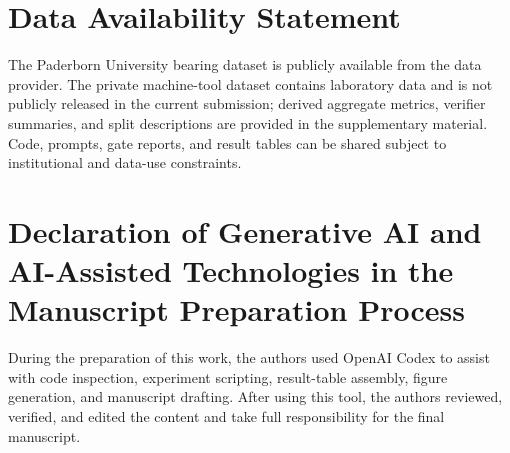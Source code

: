 \documentclass[review,3p,times]{elsarticle}
\begin{document}
\section*{Data Availability Statement}

The Paderborn University bearing dataset is publicly available from the data
provider. The private machine-tool dataset contains laboratory data and is not
publicly released in the current submission; derived aggregate metrics,
verifier summaries, and split descriptions are provided in the supplementary
material. Code, prompts, gate reports, and result tables can be shared subject
to institutional and data-use constraints.

\section*{Declaration of Generative AI and AI-Assisted Technologies in the
Manuscript Preparation Process}

During the preparation of this work, the authors used OpenAI Codex to assist
with code inspection, experiment scripting, result-table assembly, figure
generation, and manuscript drafting. After using this tool, the authors
reviewed, verified, and edited the content and take full responsibility for
the final manuscript.
\end{document}
